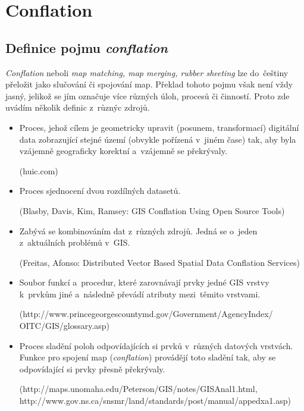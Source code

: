 \chapter{Conflation}
\label{2-conflation}

\section{Definice pojmu \textit{conflation}}
\label{definice}

\textit{Conflation} neboli \textit{map matching, map merging, rubber sheeting} 
lze do~češtiny přeložit jako slučování či spojování map. Překlad tohoto pojmu 
však není vždy jasný, jelikož se jím označuje více různých úloh, procesů či 
činností. Proto zde uvádím několik definic z~různýc zdrojů. 

\begin{itemize}[leftmargin=*]
 \item Proces, jehož cílem je geometricky upravit (posunem, transformací) 
    digitální data zobrazující stejné území (obvykle pořízená v~jiném čase) 
    tak, aby byla vzájemně geograficky korektní a~vzájemně se překrývaly. %
    
    (huic.com)

  \item Proces sjednocení dvou rozdílných datasetů.
    
    (Blasby, Davis, Kim, Ramsey: GIS Conflation Using Open Source Tools)

  \item Zabývá se kombinováním dat z~různých zdrojů. Jedná se o~jeden 
    z~aktuálních problémů v~GIS.
   
    (Freitas, Afonso: Distributed Vector Based Spatial Data Conflation 
    Services)

  \item Soubor funkcí a~procedur, které zarovnávají prvky jedné GIS vrstvy
    k~prvkům jiné a~následně převádí atributy mezi~těmito vrstvami.
   
    (http://www.princegeorgescountymd.gov/Government/AgencyIndex/
    \newline OITC/GIS/glossary.asp)

  \item Proces sladění poloh odpovídajících si prvků v~různých datových 
    vrstvách. Funkce pro spojení map (\textit{conflation}) provádějí toto 
    sladění tak, aby se odpovídající si prvky přesně překrývaly. 
    
    (http://maps.unomaha.edu/Peterson/GIS/notes/GISAnal1.html,
    \newline http://www.gov.ns.ca/snsmr/land/standards/post/manual/appedxa1.asp)


\end{itemize}
